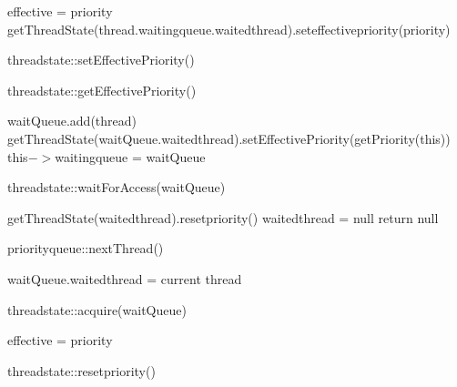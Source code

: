 \documentclass[a4paper,10pt]{article}
\begin{document}
\begin{algorithm}
\DontPrintSemicolon %
 {
    effective = priority\;
    {
       getThreadState(thread.waitingqueue.waitedthread).seteffectivepriority(priority)\;
    }
  }
\caption{threadstate::setEffectivePriority()}
\label{algo:max}
\end{algorithm}


\begin{algorithm}
\DontPrintSemicolon %
\;
\caption{threadstate::getEffectivePriority()}
\end{algorithm}

\begin{algorithm}
\DontPrintSemicolon %
waitQueue.add(thread)\;
getThreadState(waitQueue.waitedthread).setEffectivePriority(getPriority(this))\;
this$->$waitingqueue = waitQueue\;
\caption{threadstate::waitForAccess(waitQueue)}
\end{algorithm}

\begin{algorithm}
\DontPrintSemicolon %
 {
    getThreadState(waitedthread).resetpriority()\;
    waitedthread = null\;
    return null\;  }
\caption{priorityqueue::nextThread()}
\end{algorithm}


\begin{algorithm}
\DontPrintSemicolon %
waitQueue.waitedthread = current thread\;
\caption{threadstate::acquire(waitQueue)}
\end{algorithm}

\begin{algorithm}
\DontPrintSemicolon %
effective = priority\;
\caption{threadstate::resetpriority()}
\end{algorithm}
\end{document}

